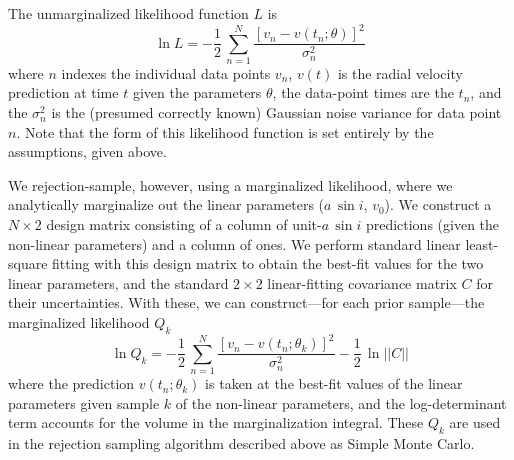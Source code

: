 \documentclass[12pt, preprint]{aastex}
\newcommand{\asini}{\ensuremath{a\,\sin i}}
\begin{document}
The unmarginalized likelihood function $L$ is
\begin{equation}
\ln L = -\frac{1}{2}\,\sum_{n=1}^N \frac{[v_n - v(t_n;\theta)]^2}{\sigma_n^2}
\end{equation}
where $n$ indexes the individual data points $v_n$, $v(t)$ is the
radial velocity prediction at time $t$ given the parameters $\theta$, the
data-point times are the $t_n$, and the $\sigma_n^2$ is the (presumed
correctly known) Gaussian noise variance for data point $n$.
Note that the form of this likelihood function is set entirely by
the assumptions, given above.

We rejection-sample, however, using a marginalized likelihood, where
we analytically marginalize out the linear parameters ($\asini$,
$v_0$).
We construct a $N\times 2$ design matrix consisting of a column of
unit-$\asini$ predictions (given the non-linear parameters) and a
column of ones.
We perform standard linear least-square fitting with this design
matrix to obtain the best-fit values for the two linear parameters,
and the standard $2\times 2$ linear-fitting covariance matrix $C$ for their
uncertainties.
With these, we can construct---for each prior sample---the marginalized likelihood $Q_k$
\begin{equation}
\ln Q_k = -\frac{1}{2}\,\sum_{n=1}^N \frac{[v_n - v(t_n;\theta_k)]^2}{\sigma_n^2} -\frac{1}{2}\,\ln ||C||
\end{equation}
where the prediction $v(t_n;\theta_k)$ is taken at the best-fit values
of the linear parameters given sample $k$ of the non-linear
parameters, and the log-determinant term accounts for the volume in
the marginalization integral.
These $Q_k$ are used in the rejection sampling algorithm described above
as Simple Monte Carlo.
\end{document}
